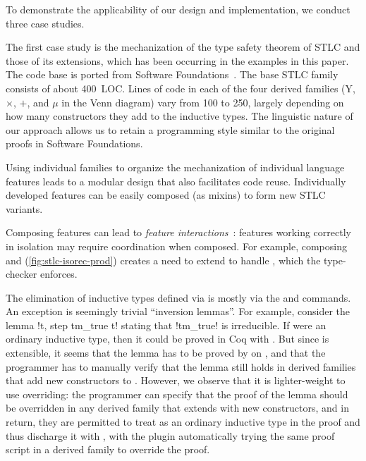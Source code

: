 
To demonstrate the applicability of our design and implementation, we
conduct three case studies.



The first case study is the mechanization of the type safety theorem of
STLC and those of its extensions,
which has been occurring in the examples in this paper.
The code base is ported from Software Foundations~\cite{sf-pl}.
%
The base STLC family consists of about 400~LOC.
Lines of code in each of the four derived families
($\mathrm{Y}$, $\times$, $+$, and $\mu$ in the Venn diagram)
vary from 100 to 250, largely depending on how many constructors they
add to the inductive types.
%
The linguistic nature of our approach allows us to retain a programming
style similar to the original proofs in Software Foundations.



Using individual families to organize the mechanization of individual
language features leads to a modular design that also facilitates code reuse.
%
Individually developed features can be easily composed (as mixins) to
form new STLC variants.

Composing features can lead to \emph{feature interactions}~\cite{batory2011feature}:
features working correctly in isolation may require coordination when composed.
For example, composing  and 
(\cref{fig:stlc-isorec-prod}) creates a need to extend  to
handle , which the type-checker enforces.

The elimination of inductive types defined via  is
mostly via the  and  commands.
An exception is seemingly trivial ``inversion lemmas''.
For example, consider the lemma \lsti!\forall t, \neg step tm_true t!
stating that \lsti!tm_true! is irreducible.
If  were an ordinary inductive type, then it could be proved in Coq
with .
But since  is extensible, it seems that the lemma has to be
proved by  on , and that the programmer
has to manually verify that the lemma still holds in derived families
that add new constructors to .
%
However, we observe that it is lighter-weight to use overriding: 
the programmer can specify that the proof of the lemma should be overridden
in any derived family that extends  with new constructors,
and in return, they are permitted to treat  as an ordinary
inductive type in the proof and thus discharge it with ,
with the plugin automatically trying the same proof script in a derived
family to override the proof.



